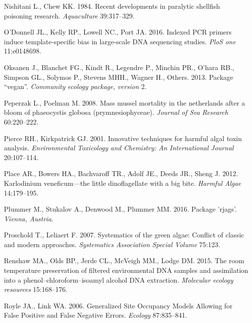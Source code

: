\documentclass[
]{article}
\begin{document}
\leavevmode\hypertarget{ref-nishitani1984recent}{}%
Nishitani L., Chew KK. 1984. Recent developments in paralytic shellfish
poisoning research. \emph{Aquaculture} 39:317--329.

\leavevmode\hypertarget{ref-o2016indexed}{}%
O'Donnell JL., Kelly RP., Lowell NC., Port JA. 2016. Indexed PCR primers
induce template-specific bias in large-scale DNA sequencing studies.
\emph{PloS one} 11:e0148698.

\leavevmode\hypertarget{ref-oksanen2013package}{}%
Oksanen J., Blanchet FG., Kindt R., Legendre P., Minchin PR., O'hara
RB., Simpson GL., Solymos P., Stevens MHH., Wagner H., Others. 2013.
Package ``vegan''. \emph{Community ecology package, version} 2.

\leavevmode\hypertarget{ref-peperzak2008mass}{}%
Peperzak L., Poelman M. 2008. Mass mussel mortality in the netherlands
after a bloom of phaeocystis globosa (prymnesiophyceae). \emph{Journal
of Sea Research} 60:220--222.

\leavevmode\hypertarget{ref-pierce2001innovative}{}%
Pierce RH., Kirkpatrick GJ. 2001. Innovative techniques for harmful
algal toxin analysis. \emph{Environmental Toxicology and Chemistry: An
International Journal} 20:107--114.

\leavevmode\hypertarget{ref-place2012karlodinium}{}%
Place AR., Bowers HA., Bachvaroff TR., Adolf JE., Deeds JR., Sheng J.
2012. Karlodinium veneficum---the little dinoflagellate with a big bite.
\emph{Harmful Algae} 14:179--195.

\leavevmode\hypertarget{ref-plummer2016package}{}%
Plummer M., Stukalov A., Denwood M., Plummer MM. 2016. Package 'rjags'.
\emph{Vienna, Austria}.

\leavevmode\hypertarget{ref-proschold2007systematics}{}%
Proschold T., Leliaert F. 2007. Systematics of the green algae: Conflict
of classic and modern approaches. \emph{Systematics Association Special
Volume} 75:123.

\leavevmode\hypertarget{ref-renshaw2015room}{}%
Renshaw MA., Olds BP., Jerde CL., McVeigh MM., Lodge DM. 2015. The room
temperature preservation of filtered environmental DNA samples and
assimilation into a phenol--chloroform--isoamyl alcohol DNA extraction.
\emph{Molecular ecology resources} 15:168--176.

\leavevmode\hypertarget{ref-royle2006generalized}{}%
Royle JA., Link WA. 2006. Generalized Site Occupancy Models Allowing for
False Positive and False Negative Errors. \emph{Ecology} 87:835--841.
\end{document}
